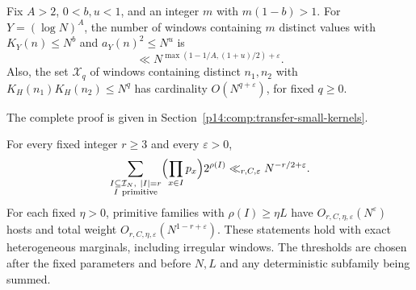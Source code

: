 \begin{lemma}
\label{p13:transfer:small-kernels}
Fix $A>2$, $0<b,u<1$, and an integer $m$ with $m(1-b)>1$.
For $Y=(\log N)^A$, the number of windows containing $m$ distinct
values with $K_Y(n)\leq N^b$ and $a_Y(n)^2\leq N^u$ is
\begin{equation}
 \ll N^{\max(1-1/A,(1+u)/2)+\varepsilon}.
 \label{p13:transfer:small-kernels-bound}
\end{equation}
Also, the set $\mathcal X_q$ of windows containing distinct $n_1,n_2$
with $K_H(n_1)K_H(n_2)\leq N^q$ has cardinality
$O(N^{q+\varepsilon})$, for fixed $q\geq0$.
\end{lemma}

\noindent The complete proof is given in Section~\ref{p14:comp:transfer-small-kernels}.


\begin{proposition}
\label{p13:transfer:primitive}
For every fixed integer $r\ge3$ and every $\varepsilon>0$,
\begin{equation}
 \sum_{\substack{I\subseteq\mathcal I_N,\ |I|=r\\I\ \mathrm{primitive}}}
         \Bigl(\prod_{x\in I}p_x\Bigr)2^{\rho(I)}
       \ll_{r,C,\varepsilon}N^{-r/2+\varepsilon}.
 \label{p13:transfer:primitive-bound}
\end{equation}
For each fixed $\eta>0$, primitive families with $\rho(I)\ge\eta L$
have $O_{r,C,\eta,\varepsilon}(N^\varepsilon)$ hosts and total
weight $O_{r,C,\eta,\varepsilon}(N^{1-r+\varepsilon})$.
These statements hold with exact heterogeneous marginals, including
irregular windows. The thresholds are chosen after the fixed parameters
and before $N,L$ and any deterministic subfamily being summed.
\end{proposition}

